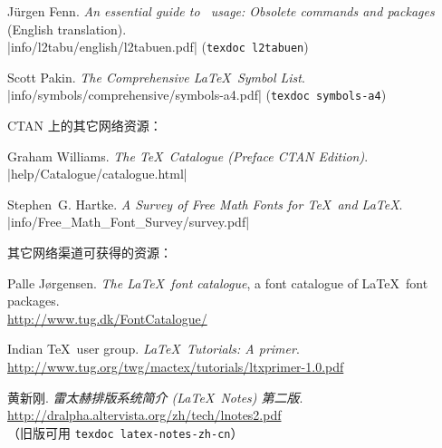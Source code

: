 \begin{thebibliography}{20}
 J\"{u}rgen Fenn.
  \newblock \emph{An essential guide to \LaTeXe\ usage: Obsolete commands and packages} (English translation). \\
  \newblock \CTAN|info/l2tabu/english/l2tabuen.pdf| (\texttt{texdoc l2tabuen})

 Scott Pakin.
  \newblock \emph{The Comprehensive \LaTeX\ Symbol List}. \\
  \newblock \CTAN|info/symbols/comprehensive/symbols-a4.pdf| (\texttt{texdoc symbols-a4})

\item[\textbullet] CTAN 上的其它网络资源：

 Graham Williams.
  \newblock \emph{The \TeX\ Catalogue (Preface CTAN Edition)}.\\
  \newblock \CTAN|help/Catalogue/catalogue.html|

 Stephen~G. Hartke.
  \newblock \emph{A Survey of Free Math Fonts for \TeX\ and \LaTeX}.\\
  \newblock \CTAN|info/Free_Math_Font_Survey/survey.pdf|

\item[\textbullet] 其它网络渠道可获得的资源：

 Palle J{\o}rgensen.
  \newblock \emph{The \LaTeX\ font catalogue}, a font catalogue of \LaTeX\ font packages.\\
  \newblock \url{http://www.tug.dk/FontCatalogue/}

 Indian \TeX\ user group. 
  \newblock \emph{\LaTeX\ Tutorials: A primer}. \\
  \newblock \url{http://www.tug.org/twg/mactex/tutorials/ltxprimer-1.0.pdf}

 黄新刚. 
  \newblock \emph{雷太赫排版系统简介 (\LaTeX\ Notes) 第二版}. \\
  \newblock \url{http://dralpha.altervista.org/zh/tech/lnotes2.pdf} \\
  （旧版可用 \texttt{texdoc latex-notes-zh-cn}）

\end{thebibliography}

\endinput
